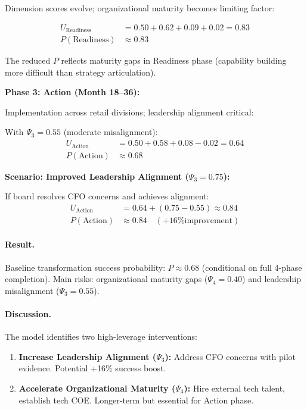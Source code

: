 Dimension scores evolve; organizational maturity becomes limiting factor:

\begin{align}
U_{\text{Readiness}} &= 0.50 + 0.62 + 0.09 + 0.02 = 0.83 \\
P(\text{Readiness}) &\approx 0.83
\end{align}

The reduced $P$ reflects maturity gaps in Readiness phase (capability building more difficult than strategy articulation).

\textbf{Phase 3: Action (Month 18--36):}

Implementation across retail divisions; leadership alignment critical:

With $\Psi_3 = 0.55$ (moderate misalignment):
\begin{align}
U_{\text{Action}} &= 0.50 + 0.58 + 0.08 - 0.02 = 0.64 \\
P(\text{Action}) &\approx 0.68
\end{align}

\textbf{Scenario: Improved Leadership Alignment ($\Psi_3 = 0.75$):}

If board resolves CFO concerns and achieves alignment:
\begin{align}
U_{\text{Action}} &= 0.64 + (0.75 - 0.55) \approx 0.84 \\
P(\text{Action}) &\approx 0.84 \quad (\text{+16\% improvement})
\end{align}

\paragraph{Result.}

Baseline transformation success probability: $P \approx 0.68$ (conditional on full 4-phase completion). Main risks: organizational maturity gaps ($\Psi_4 = 0.40$) and leadership misalignment ($\Psi_3 = 0.55$).

\paragraph{Discussion.}

The model identifies two high-leverage interventions:

\begin{enumerate}
    \item \textbf{Increase Leadership Alignment ($\Psi_3$):} Address CFO concerns with pilot evidence. Potential +16\% success boost.

    \item \textbf{Accelerate Organizational Maturity ($\Psi_4$):} Hire external tech talent, establish tech COE. Longer-term but essential for Action phase.
\end{enumerate}

